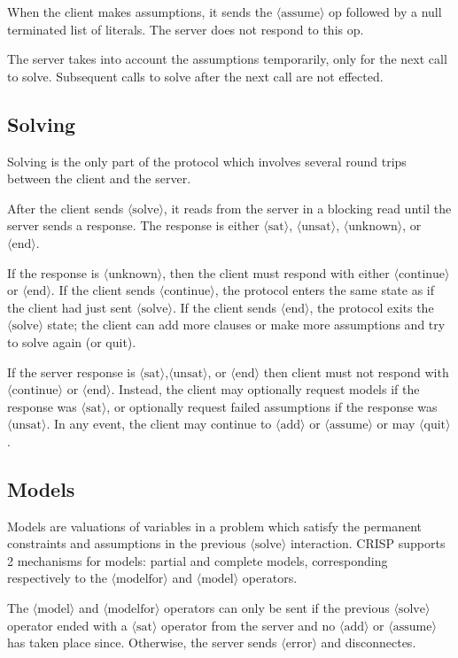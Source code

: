 \documentclass{article}
\newcommand\proto[1]{$\langle\mbox{#1}\rangle$}
\begin{document}
When the client makes assumptions, it sends the \proto{assume} op followed by
a null terminated list of literals.  The server does not respond to this
op.

The server takes into account the assumptions temporarily, only for the next
call to solve.  Subsequent calls to solve after the next call are not
effected.

\subsection{Solving}

Solving is the only part of the protocol which involves several
round trips between the client and the server.

After the client sends \proto{solve}, it reads from the server in a blocking read
until the server sends a response.  The response is either \proto{sat}, \proto{unsat},
\proto{unknown}, or \proto{end}.

 If the response is \proto{unknown}, then the client must respond with either
 \proto{continue} or \proto{end}.  If the client sends \proto{continue},  the protocol enters
 the same state as if the client had just sent \proto{solve}.  If the client sends
 \proto{end}, the protocol exits the \proto{solve} state; the client can add more clauses
 or make more assumptions and try to solve again (or quit).

 If the server response is \proto{sat},\proto{unsat}, or \proto{end} then client must not respond
 with \proto{continue} or \proto{end}.  Instead, the client may optionally request models
 if the response was \proto{sat}, or optionally request failed assumptions if the
 response was \proto{unsat}.  In any event, the client may continue to \proto{add} or
 \proto{assume} or may \proto{quit}.

\subsection{Models}

Models are valuations of variables in a problem which satisfy the permanent
constraints and assumptions in the previous \proto{solve} interaction.  CRISP
supports 2 mechanisms for models: partial and complete models, corresponding
respectively to the \proto{modelfor} and \proto{model} operators.

The \proto{model} and \proto{modelfor} operators can only be sent if the previous \proto{solve} operator
ended with a \proto{sat} operator from the server and no \proto{add} or \proto{assume} has taken place since.
Otherwise, the server sends \proto{error} and disconnectes.
\end{document}
